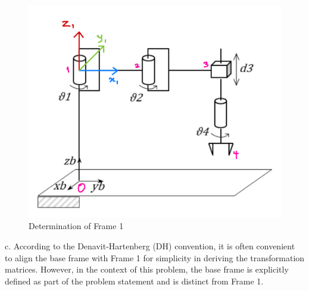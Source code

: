 \documentclass[12pt]{report}
\begin{document}
\begin{figure}[H]
	\centering
	\includegraphics[scale = 0.3]{2} %
	\caption{Determination of Frame 1}
	\label{fig:your_label} %
\end{figure}

c. According to the Denavit-Hartenberg (DH) convention, it is often convenient to align the base frame with Frame 1 for simplicity in deriving the transformation matrices. However, in the context of this problem, the base frame is explicitly defined as part of the problem statement and is distinct from Frame 1.
\end{document}
